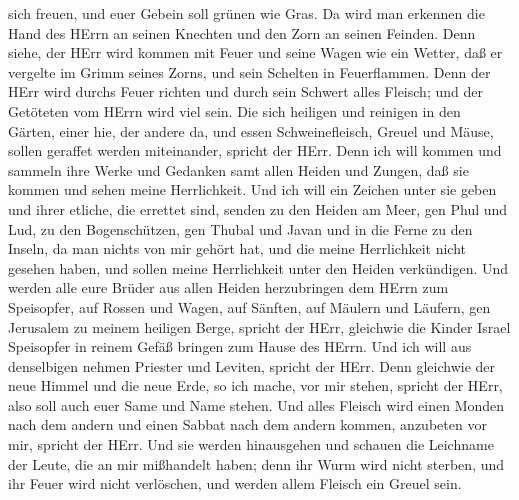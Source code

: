 sich freuen, und euer Gebein soll grünen wie Gras. Da wird man erkennen
die Hand des HErrn an seinen Knechten und den Zorn an seinen Feinden.
 Denn siehe, der HErr wird kommen mit Feuer und seine Wagen
wie ein Wetter, daß er vergelte im Grimm seines Zorns, und sein Schelten
in Feuerflammen.  Denn der HErr wird durchs Feuer richten
und durch sein Schwert alles Fleisch; und der Getöteten vom HErrn wird
viel sein.  Die sich heiligen und reinigen in den Gärten,
einer hie, der andere da, und essen Schweinefleisch, Greuel und Mäuse,
sollen geraffet werden miteinander, spricht der HErr.  Denn
ich will kommen und sammeln ihre Werke und Gedanken samt allen Heiden
und Zungen, daß sie kommen und sehen meine Herrlichkeit. 
Und ich will ein Zeichen unter sie geben und ihrer etliche, die errettet
sind, senden zu den Heiden am Meer, gen Phul und Lud, zu den
Bogenschützen, gen Thubal und Javan und in die Ferne zu den Inseln, da
man nichts von mir gehört hat, und die meine Herrlichkeit nicht gesehen
haben, und sollen meine Herrlichkeit unter den Heiden verkündigen.
 Und werden alle eure Brüder aus allen Heiden herzubringen
dem HErrn zum Speisopfer, auf Rossen und Wagen, auf Sänften, auf Mäulern
und Läufern, gen Jerusalem zu meinem heiligen Berge, spricht der HErr,
gleichwie die Kinder Israel Speisopfer in reinem Gefäß bringen zum Hause
des HErrn.  Und ich will aus denselbigen nehmen Priester
und Leviten, spricht der HErr.  Denn gleichwie der neue
Himmel und die neue Erde, so ich mache, vor mir stehen, spricht der
HErr, also soll auch euer Same und Name stehen.  Und alles
Fleisch wird einen Monden nach dem andern und einen Sabbat nach dem
andern kommen, anzubeten vor mir, spricht der HErr.  Und
sie werden hinausgehen und schauen die Leichname der Leute, die an mir
mißhandelt haben; denn ihr Wurm wird nicht sterben, und ihr Feuer wird
nicht verlöschen, und werden allem Fleisch ein Greuel sein.
